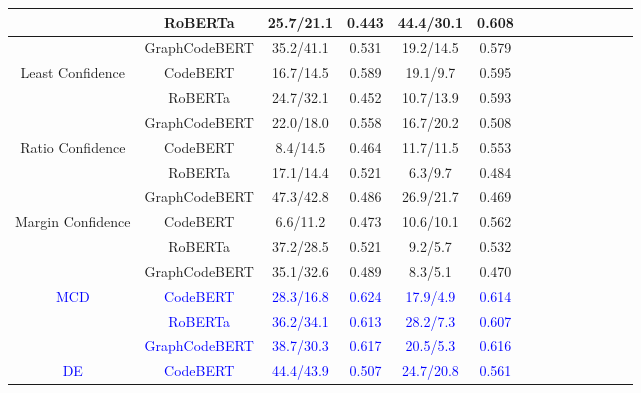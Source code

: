 \begin{table}[htb!]
{\begin{tabular}{ccccccccc ccccc}
    & RoBERTa & 25.7/21.1&0.443 &44.4/30.1 &  0.608  \\\cline

    & GraphCodeBERT &35.2/41.1 &0.531 & 19.2/14.5&0.579  \\\hline

    \multirow{3}{*}{ Least Confidence} & CodeBERT  & 16.7/14.5&0.589 &19.1/9.7 &0.595  \\\cline

    & RoBERTa & 24.7/32.1& 0.452& 10.7/13.9&  0.593  \\\cline

    & GraphCodeBERT &22.0/18.0 &0.558 &16.7/20.2 & 0.508 \\\hline

    \multirow{3}{*}{Ratio Confidence} & CodeBERT  & 8.4/14.5&0.464 & 11.7/11.5&0.553  \\\cline

    & RoBERTa &17.1/14.4 & 0.521& 6.3/9.7&  0.484  \\\cline

    & GraphCodeBERT &47.3/42.8 &0.486 &26.9/21.7 & 0.469 \\\hline

    \multirow{3}{*}{ Margin Confidence} & CodeBERT  & 6.6/11.2&0.473 &10.6/10.1 & 0.562 \\\cline

    & RoBERTa & 37.2/28.5& 0.521&9.2/5.7 &   0.532 \\\cline

    & GraphCodeBERT &35.1/32.6 & 0.489& 8.3/5.1&0.470  \\\hline


   \multirow{3}{*}{ \textcolor{blue}{MCD}} & \textcolor{blue}{CodeBERT}  & \textcolor{blue}{28.3/16.8} &\textcolor{blue}{0.624} &\textcolor{blue}{17.9/4.9} & \textcolor{blue}{0.614}  \\\cline
   
   & \textcolor{blue}{RoBERTa} &\textcolor{blue}{36.2/34.1} &\textcolor{blue}{0.613} & \textcolor{blue}{28.2/7.3}&   \textcolor{blue}{0.607} \\\cline
    
    & \textcolor{blue}{GraphCodeBERT} &\textcolor{blue}{38.7/30.3} & \textcolor{blue}{0.617}& \textcolor{blue}{20.5/5.3}&\textcolor{blue}{0.616}  \\\hline

    \multirow{3}{*}{ \textcolor{blue}{DE}} & \textcolor{blue}{CodeBERT}  & \textcolor{blue}{44.4/43.9} &\textcolor{blue}{0.507} &\textcolor{blue}{24.7/20.8} & \textcolor{blue}{0.561}  \\\cline
   

\end{tabular}}
\end{table}
